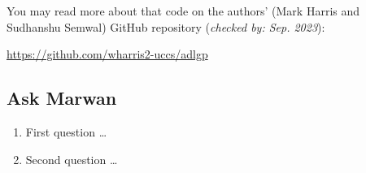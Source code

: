 You may read more about that code on the authors' (Mark Harris and Sudhanshu Semwal) GitHub repository (\textit{checked by: Sep. 2023}):

\url{https://github.com/wharris2-uccs/adlgp}

\subsection{Ask Marwan}

\begin{enumerate}[label={Question \arabic*.}]
    \item First question \dots
    \item Second question \dots
\end{enumerate}
